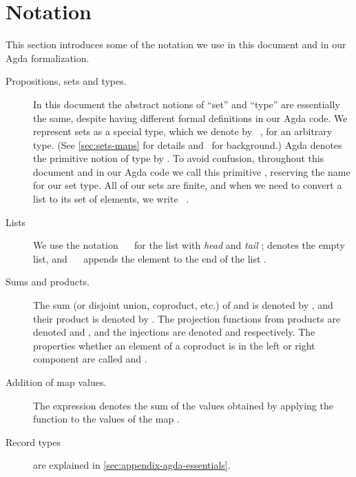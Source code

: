 \section{Notation}
\label{sec:notation}
This section introduces some of the notation we use in this document and in our Agda formalization.

\begin{description}
\item[Propositions, sets and types.] In this document the abstract notions of ``set''
and ``type'' are essentially the same, despite having different formal definitions
in our Agda code. We represent sets as a special type, which we denote by
~, for  an arbitrary type.
(See \cref{sec:sets-maps} for details and~\textcite[Ch.~19]{NPS:1990-open} for
background.)
Agda denotes the primitive notion of type by .  To avoid confusion,
throughout this document and in our Agda code we call this primitive \Type{},
reserving the name  for our set type.
All of our sets are finite, and when we need to convert
a list  to its set of elements, we write \fromList{}~.
\item[Lists] We use the notation ~~ for
  the list with \textit{head}  and \textit{tail} ;
  \AgdaInductiveConstructor{[]} denotes the empty list, and
  ~~ appends the element 
  to the end of the list .
\item[Sums and products.] The sum (or disjoint union, coproduct, etc.) of  and
   is denoted by  \coproduct{} , and their product
  is denoted by  \agdatimes{} . The projection functions from products
  are denoted \fst{} and \snd{}, and the injections are denoted \inl{} and \inr{} respectively. The
  properties whether an element of a coproduct is in the left or right component are called
  \isInl{} and \isInr{}.
\item[Addition of map values.] The expression
\AgdaFunction{∑[}\AgdaSpace{}%
\AgdaSpace{}%
\AgdaSpace{}%
\AgdaSpace{}%
\AgdaFunction{]}\AgdaSpace{}%
\AgdaSpace{}%
denotes the sum of the values obtained by applying the function  to the values
of the map .
\item[Record types] are explained in \cref{sec:appendix-agda-essentials}.

\end{description}
